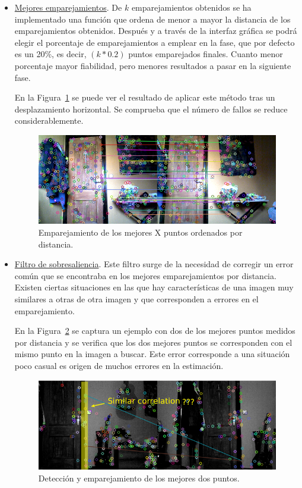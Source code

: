 \begin{itemize}
\item \underline{Mejores emparejamientos}. De $k$ emparejamientos obtenidos se ha implementado una función que ordena de menor a mayor la distancia de los emparejamientos obtenidos. Después y a través de la interfaz gráfica se podrá elegir el porcentaje de emparejamientos a emplear en la fase, que por defecto es un 20\%, es decir, $(k*0.2)$ puntos emparejados finales. Cuanto menor porcentaje mayor fiabilidad, pero menores resultados a pasar en la siguiente fase.

En la Figura~\ref{fig:bestPointsSift} se puede ver el resultado de aplicar este método tras un desplazamiento horizontal. Se comprueba que el número de fallos se reduce considerablemente.

\begin{figure}[th]
\centering
\includegraphics[scale=0.6]{Figures/best_points_sift.png}
\decoRule
\caption[Captura de los mejores puntos con SIFT]{Emparejamiento de los mejores X puntos ordenados por distancia.}
\label{fig:bestPointsSift}
\end{figure}

\item \underline{Filtro de sobresaliencia}. Este filtro surge de la necesidad de corregir un error común que se encontraba en los mejores emparejamientos por distancia. Existen ciertas situaciones en las que hay características de una imagen muy similares a otras de otra imagen y que corresponden a errores en el emparejamiento.

En la Figura~\ref{fig:similarCorrelation} se captura un ejemplo con dos de los mejores puntos medidos por distancia y se verifica que los dos mejores puntos se corresponden con el mismo punto en la imagen a buscar. Este error corresponde a una situación poco casual es origen de muchos errores en la estimación.

\begin{figure}[th]
\centering
\includegraphics[scale=0.6]{Figures/similar-correlation.png}
\decoRule
\caption[Captura con error de los dos mejores puntos en SIFT]{Detección y emparejamiento de los mejores dos puntos.}
\label{fig:similarCorrelation}
\end{figure}


\end{itemize}
